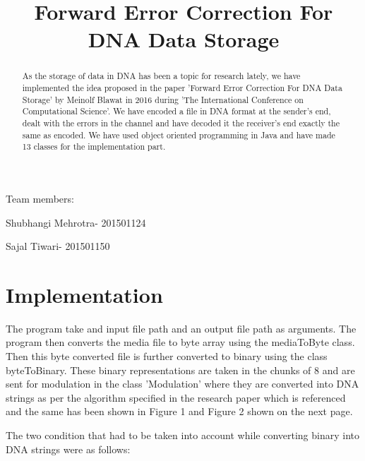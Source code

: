 \documentclass[twoside]{ASDJ}
\begin{document}



\title{Forward Error Correction For DNA Data Storage}


\maketitle
\begin{center}
    
Team members:

Shubhangi Mehrotra- 201501124


Sajal Tiwari- 201501150\\
\end{center}



\begin{abstract}
As the storage of data in DNA has been a topic for research lately, we have implemented the idea proposed in the paper 'Forward Error Correction For DNA Data Storage' by Meinolf Blawat in 2016 during 'The International Conference  on Computational Science'. We have encoded a file in DNA format at the sender's end, dealt with the errors in the channel and have decoded it the receiver's end exactly the same as encoded. We have used object oriented programming in Java and have made 13 classes for the implementation part.

\end{abstract}



\section{Implementation}
The program take and input file path and an output file path as arguments. The program then converts the media file to byte array using the mediaToByte class. Then this byte converted file is further converted to binary using the class byteToBinary. These binary representations are taken in the chunks of 8 and are sent for modulation in the class 'Modulation' where they are converted into DNA strings as per the algorithm specified in the research paper which is referenced and the same has been shown in Figure 1 and Figure 2 shown on the next page. 


The two condition that had to be taken into account while converting binary into DNA strings were as follows:
\end{document}
